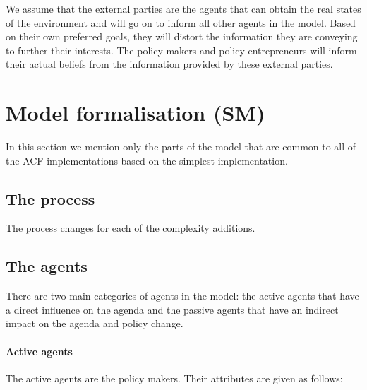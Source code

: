 \documentclass[11pt]{article}
\begin{document}
We assume that the external parties are the agents that can obtain the real states of the environment and will go on to inform all other agents in the model. Based on their own preferred goals, they will distort the information they are conveying to further their interests. The policy makers and policy entrepreneurs will inform their actual beliefs from the information provided by these external parties.



\section{Model formalisation (SM)}

In this section we mention only the parts of the model that are common to all of the ACF implementations based on the simplest implementation.

\subsection{The process}

The process changes for each of the complexity additions.


\subsection{The agents}

There are two main categories of agents in the model: the active agents that have a direct influence on the agenda and the passive agents that have an indirect impact on the agenda and policy change.

\paragraph{Active agents}

The active agents are the policy makers. Their attributes are given as follows:
\end{document}
